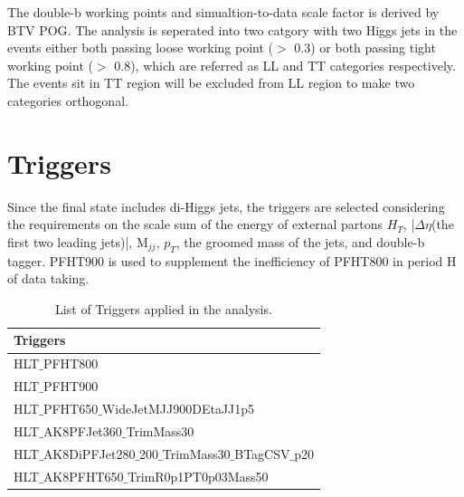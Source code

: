 The double-b working points and simualtion-to-data scale factor is derived by BTV POG\citep{BtagRecommendation80XReReco}.
The analysis is seperated into two catgory with two Higgs jets in the events either both passing loose working point ($>$ 0.3) or both passing tight working point ($>$ 0.8), which are referred as LL and TT categories respectively. The events sit in TT region will be excluded from LL region to make two categories orthogonal.



\section{Triggers} \label{Triggers}
Since the final state includes di-Higgs jets, the triggers are selected considering the requirements on the scale sum of the energy of external partons $H_T$, |$\Delta \eta $(the first two leading jets)|, M$_{jj}$, $p_T$, the groomed mass of the jets, and double-b tagger. PFHT900 is used to supplement the inefficiency of PFHT800 in period H of data taking.
\begin{table}[h!]
  \begin{center}
    \begin{tabular}{l}
    Triggers \\
    \hline
    HLT$\_$PFHT800 \\
    HLT$\_$PFHT900 \\
    HLT$\_$PFHT650$\_$WideJetMJJ900DEtaJJ1p5 \\
    HLT$\_$AK8PFJet360$\_$TrimMass30 \\
    HLT$\_$AK8DiPFJet280$\_$200$\_$TrimMass30$\_$BTagCSV$\_$p20 \\
    HLT$\_$AK8PFHT650$\_$TrimR0p1PT0p03Mass50 \\
    \hline
    \end{tabular}
  \end{center}

  \caption{List of Triggers applied in the analysis.}
\end{table} 

